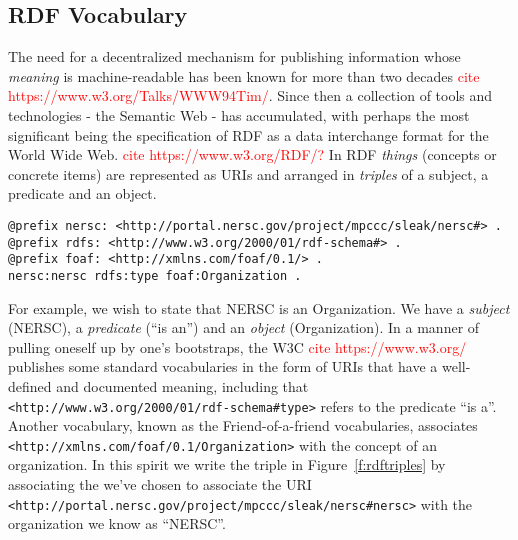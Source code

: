 \subsection{RDF Vocabulary}

The need for a decentralized mechanism for publishing information whose 
\emph{meaning} is machine-readable has been known for more than two decades
\textcolor{red}{cite https://www.w3.org/Talks/WWW94Tim/}. Since then a 
collection of tools and technologies - the Semantic Web - has accumulated, with
perhaps the most significant being the specification of RDF as a data 
interchange format for the World Wide Web. \textcolor{red}{cite https://www.w3.org/RDF/?}
In RDF \emph{things} (concepts or concrete items) are represented as URIs
and arranged in \emph{triples} of a subject, a predicate and an object. 

\begin{figure*}
\begin{verbatim}
@prefix nersc: <http://portal.nersc.gov/project/mpccc/sleak/nersc#> .
@prefix rdfs: <http://www.w3.org/2000/01/rdf-schema#> .
@prefix foaf: <http://xmlns.com/foaf/0.1/> .
nersc:nersc rdfs:type foaf:Organization .
\end{verbatim}

\caption{A triple of (subject, predicate, object) describes an edge 
in an RDF graph. The \texttt{Turtle}\textcolor{red}{cite} syntax shown
here aids human readability by condensing URIs into a prefix and a suffix,
so for example \texttt{rdfs:type} expands as
\texttt{<http://www.w3.org/2000/01/rdf-schema\#type>}.}
\label{f:rdftriples}
\end{figure*}

For example, we wish to state that NERSC is an Organization. We have a 
\emph{subject} (NERSC), a \emph{predicate} (``is an'') and an \emph{object} 
(Organization). In a manner of pulling oneself up by one's bootstraps, the 
W3C \textcolor{red}{cite https://www.w3.org/} publishes some standard 
vocabularies in the form of URIs that have a well-defined and documented 
meaning, including that \texttt{<http://www.w3.org/2000/01/rdf-schema\#type>}
refers to the predicate ``is a''. Another vocabulary, known as the 
Friend-of-a-friend vocabularies, associates \texttt{<http://xmlns.com/foaf/0.1/Organization>} with the concept of an 
organization. In this spirit we write the triple in Figure~\ref{f:rdftriples}
by associating the 
we've chosen to associate the URI \texttt{<http://portal.nersc.gov/project/mpccc/sleak/nersc\#nersc>} with the 
organization we know as ``NERSC''. 

